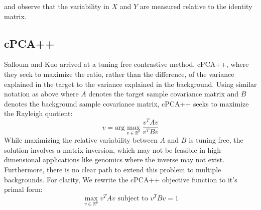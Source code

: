 \documentclass[12pt]{article}
\begin{document}
and observe that the variability in $X$ and $Y$ are measured relative to the identity matrix.

\subsection{cPCA++}
Salloum and Kuo  \cite{Salloum} arrived at a tuning free contrastive method, cPCA++, where they seek to maximize the ratio, rather than the difference, of the variance explained in the target to the variance explained in the background.
Using similar notation as above where $A$ denotes the target sample covariance matrix and $B$ denotes the background sample covariance matrix, cPCA++ seeks to maximize the Rayleigh quotient:
\[v = \text{arg}\max_{v\in \mathbb{R}^p} \frac{v^T A v}{v^T B v}\]
While maximizing the relative variability between $A$ and $B$ is tuning free, the solution involves a matrix inversion, which may not be feasible in high-dimensional applications like genomics where the inverse may not exist. Furthermore, there is no clear path to extend this problem to multiple backgrounds.
For clarity, We rewrite the cPCA++ objective function to it's primal form\cite{ghojogh2019eigenvalue}:
\[\max_{v \in \mathbb{R}^p}{v^T A v}  \mbox{ subject to } v^T B v = 1\]


\end{document}
